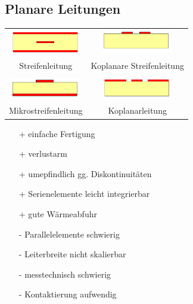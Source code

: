 \documentclass[english]{latex4ei/latex4ei_sheet}
\begin{document}
\begin{sectionbox}
    \subsection{Planare Leitungen}
    \begin{tabular*}{\columnwidth}{cc}
        \includegraphics[width = 3cm]{./img/streifenleitung.png} & \includegraphics[width = 3cm]{./img/koplanar_streifen_leitung.png}\\
        Streifenleitung & Koplanare Streifenleitung\\
        \hline\\
        \includegraphics[width = 3cm]{./img/mikrostreifen_leitung.png} & \includegraphics[width = 3cm]{./img/koplanar_leitung.png}\\
        Mikrostreifenleitung & Koplanarleitung\\
    \end{tabular*}
    \vspace{-6mm}
    \begin{multicols*}{2}
        \begin{itemize}
            \item[+] einfache Fertigung
            \item[+] verlustarm
            \item[+] umepfindlich gg. Diskontinuitäten
            \item[+] Serienelemente leicht integrierbar
            \item[+] gute Wärmeabfuhr
            \item[-] Parallelelemente schwierig
            \item[-] Leiterbreite nicht skalierbar
            \item[-] messtechnisch schwierig
            \item[-] Kontaktierung aufwendig
        \end{itemize}

\end{multicols*}
\end{sectionbox}
\end{document}
